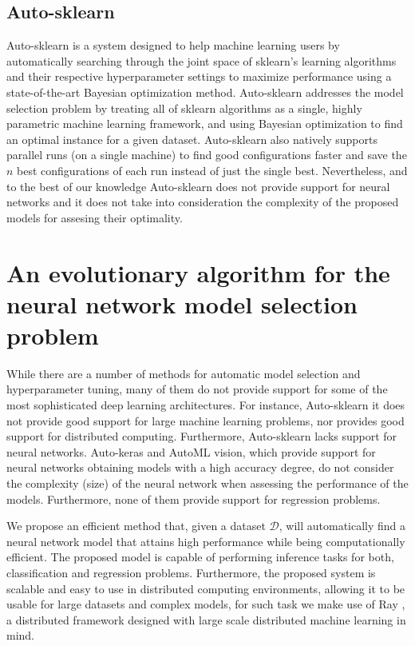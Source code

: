\documentclass[journal]{IEEEtran}
\begin{document}
\subsection{Auto-sklearn}

Auto-sklearn \cite{Feurer2015} is a system designed to help machine learning users by automatically searching through the joint space of sklearn's learning algorithms and their respective hyperparameter settings to maximize performance using a state-of-the-art Bayesian optimization method. Auto-sklearn addresses the model selection problem by treating all of sklearn algorithms as a single, highly parametric machine learning framework, and using Bayesian optimization to find an optimal instance for a given dataset. Auto-sklearn also natively supports parallel runs (on a single machine) to find good configurations faster and save the $n$ best configurations of each run instead of just the single best. Nevertheless, and to the best of our knowledge Auto-sklearn does not provide support for neural networks and it does not take into consideration the complexity of the proposed models for assesing their optimality.


\section{An evolutionary algorithm for the neural network model selection problem }
\label{sec:auto_nn}

While there are a number of methods for automatic model selection and hyperparameter tuning, many of them do not provide support for some of the most sophisticated deep learning architectures. For instance, Auto-sklearn it does not provide good support for large machine learning problems, nor provides good support for distributed computing. Furthermore, Auto-sklearn lacks support for neural networks. Auto-keras and AutoML vision, which provide support for neural networks obtaining models with a high accuracy degree, do not consider the complexity (size) of the neural network when assessing the performance of the models. Furthermore, none of them provide support for regression problems.

We propose an efficient method that, given a dataset $\mathcal{D}$, will automatically find a neural network model that attains high performance while being computationally efficient. The proposed model is capable of performing inference tasks for both, classification and regression problems. Furthermore, the proposed system is scalable and easy to use in distributed computing environments, allowing it to be usable for large datasets and complex models, for such task we make use of Ray \cite{Moritz2017}, a distributed framework designed with large scale distributed machine learning in mind.
\end{document}
